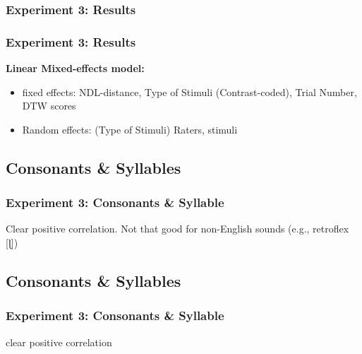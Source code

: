 \documentclass{beamer}
\begin{document}
\begin{frame}[shrink=10]
\frametitle{Experiment 3: Results}
\begin{center}

\end{center}
\end{frame}

\begin{frame}
\frametitle{Experiment 3: Results}
\textbf{Linear Mixed-effects model:} \linebreak
\begin{itemize}
\item fixed effects: NDL-distance, Type of Stimuli (Contrast-coded), Trial Number, DTW scores
\item Random effects: (Type of Stimuli) Raters, stimuli
\end{itemize}

\end{frame}
\subsection{Consonants \& Syllables}
\begin{frame}[shrink=30]
\frametitle{Experiment 3: Consonants \& Syllable}
\centering
\begin{figure}

\end{figure}

Clear positive correlation. \linebreak
Not that good for non-English sounds (e.g., retroflex [ɭ])
\end{frame}
\subsection{Consonants \& Syllables}
\begin{frame}[shrink=30]
\frametitle{Experiment 3: Consonants \& Syllable}
\centering
\begin{figure}

\end{figure}
clear positive correlation
\end{frame}
\end{document}
